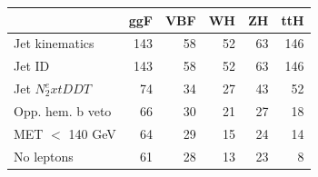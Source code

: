 \begin{tabular}{lrrrrr}
\toprule
 & ggF & VBF & WH & ZH & ttH \\
\midrule
Jet kinematics & 143 & 58 & 52 & 63 & 146 \\
Jet ID & 143 & 58 & 52 & 63 & 146 \\
Jet $N_2^	ext{DDT}$ & 74 & 34 & 27 & 43 & 52 \\
Opp. hem. b veto & 66 & 30 & 21 & 27 & 18 \\
MET $<$ 140 GeV & 64 & 29 & 15 & 24 & 14 \\
No leptons & 61 & 28 & 13 & 23 & 8 \\
\bottomrule
\end{tabular}
